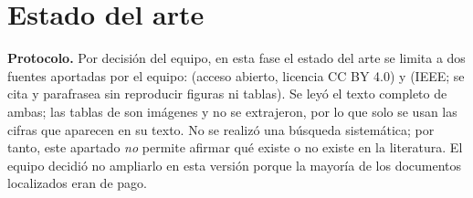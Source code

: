 \documentclass[11pt,a4paper]{article}
\begin{document}
\section{Estado del arte}

\textbf{Protocolo.} Por decisión del equipo, en esta fase el estado del arte se
limita a dos fuentes aportadas por el equipo: \cite{otting2023} (acceso
abierto, licencia CC BY 4.0) y \cite{fani2017} (IEEE; se cita y parafrasea sin
reproducir figuras ni tablas). Se leyó el texto completo de ambas; las tablas de
\cite{fani2017} son imágenes y no se extrajeron, por lo que solo se usan las
cifras que aparecen en su texto. No se realizó una búsqueda sistemática; por
tanto, este apartado \emph{no} permite afirmar qué existe o no existe en la
literatura. El equipo decidió no ampliarlo en esta versión porque la mayoría
de los documentos localizados eran de pago.
\end{document}
